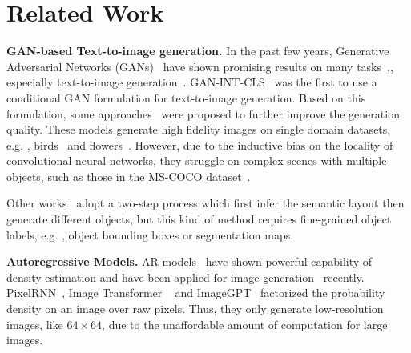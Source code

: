 \section{Related Work}

 \textbf{GAN-based Text-to-image generation.} In the past few years, Generative Adversarial Networks (GANs)~\cite{goodfellow2014generative} have shown promising results on many tasks~\cite{gu2019mask,gu2020giqa,gu2020priorgan},, especially text-to-image generation~\cite{reed2016generative,zhang2017stackgan,dash2017tac,nguyen2017plug,sharma2018chatpainter,hong2018inferring,xu2018attngan,zhang2018stackgan++,zhang2018photographic,gao2019perceptual,lao2019dual,li2019object,qiao2019learn,qiao2019mirrorgan,yin2019semantics,tan2019semantics,zhu2019dm,li2019controllable,cha2019adversarial,el2019tell,cheng2020rifegan,souza2020efficient,liang2020cpgan,tao2020df,zhang2021cross,ruan2021dae,tan2020kt,huang2021unifying}. GAN-INT-CLS~\cite{reed2016generative} was the first to use a conditional GAN formulation for text-to-image generation. Based on this formulation, some approaches~\cite{zhang2017stackgan,zhang2018stackgan++,xu2018attngan,zhu2019dm,qiao2019mirrorgan,yin2019semantics,zhang2021cross,liang2020cpgan} were proposed to further improve the generation quality. These models generate high fidelity images on single domain datasets, e.g. , birds~\cite{wah2011caltech} and flowers~\cite{nilsback2008automated}. However, due to the inductive bias on the locality of convolutional neural networks, they struggle on complex scenes with multiple objects, such as those in the MS-COCO dataset~\cite{lin2014microsoft}. 

Other works~\cite{hong2018inferring,li2019object} adopt a two-step process which first infer the semantic layout then generate different objects, but this kind of method requires fine-grained object labels, e.g. , object bounding boxes or segmentation maps. 

 \textbf{Autoregressive Models.} AR models~\cite{radford2018improving,radford2019language,brown2020language} have shown powerful capability of density estimation and have been applied for image generation~\cite{salimans2017pixelcnn++,van2016pixel,parmar2018image,oord2017neural,razavi2019generating,chen2020generative,esser2021taming} recently. PixelRNN~\cite{salimans2017pixelcnn++,van2016pixel}, Image Transformer ~\cite{parmar2018image} and ImageGPT~\cite{chen2020generative} factorized the probability density on an image over raw pixels. Thus, they only generate low-resolution images, like $64 \times 64$, due to the unaffordable amount of computation for large images. 

